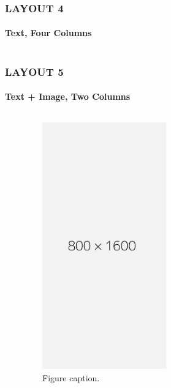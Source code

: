 \documentclass[14 pt]{beamer}
\begin{document}

\begin{frame}[t]
\frametitle{LAYOUT 4}
\framesubtitle{Text, Four Columns}
\begin{columns}[t]
\begin{column}{0.225\textwidth}
\lipsum[3]
\end{column}
\begin{column}{0.225\textwidth}
\lipsum[5]
\end{column}
\begin{column}{0.225\textwidth}
\lipsum[3]
\end{column}
\begin{column}{0.225\textwidth}
\lipsum[3]
\end{column}
\end{columns}
\end{frame}



\begin{frame}[t]
\frametitle{LAYOUT 5}
\framesubtitle{Text + Image, Two Columns}

\begin{columns}[t]
\begin{column}{0.45\textwidth}
\lipsum[7]
\vskip0.5cm%
\lipsum[8]
\end{column}
\begin{column}{0.45\textwidth}
\begin{figure}[t]
\includegraphics[width=0.5\textwidth]{img/800x1600.png}
\caption{Figure caption.}
\end{figure}

\end{column}
\end{columns}
\end{frame}
\end{document}

